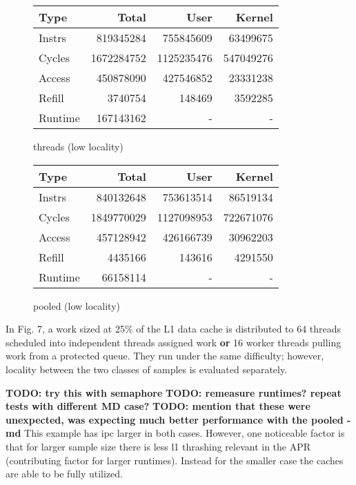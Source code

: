 \documentclass[11pt]{article}
\begin{document}
\begin{figure*}[!h]
	\begin{subtable}{.48\textwidth} 
		\centering
		\begin{tabular}{ l|rrr }
			Type    & Total      & User       & Kernel    \\
			\hline
			Instrs  & 819345284  & 755845609  & 63499675  \\
			Cycles  & 1672284752 & 1125235476 & 547049276 \\
			Access  & 450878090  & 427546852  & 23331238  \\
			Refill  & 3740754    & 148469     & 3592285   \\
			Runtime & 167143162  & -          & -         \\
			\hline
		\end{tabular}
		\caption{threads (low locality)}
	\end{subtable}
	\hfill
	\begin{subtable}{.48\textwidth} 
		\centering
		\begin{tabular}{ l|rrr }
			Type    & Total      & User       & Kernel    \\
			\hline
			Instrs  & 840132648  & 753613514  & 86519134  \\
			Cycles  & 1849770029 & 1127098953 & 722671076 \\
			Access  & 457128942  & 426166739  & 30962203  \\
			Refill  & 4435166    & 143616     & 4291550   \\
			Runtime & 66158114   & -          & -         \\
			\hline
		\end{tabular}
		\caption{pooled (low locality)}
	\end{subtable}
\end{figure*}

In Fig. 7, a work sized at 25\% of the L1 data cache is distributed to 64 threads scheduled into independent threads assigned work \textbf{or} 16 worker threads pulling work from a protected queue.  They run under the same difficulty; however, locality between the two classes of samples is evaluated separately.

\textbf{TODO: try this with semaphore}
\textbf{TODO: remeasure runtimes? repeat tests with different MD case?}
\textbf{TODO: mention that these were unexpected, was expecting much better performance with the pooled - md}
This example has ipc larger in both cases.    However, one noticeable factor is that for larger sample size there is less l1 thrashing relevant in the APR (contributing factor for larger runtimes).  Instead for the smaller case the caches are able to be fully utilized.
\end{document}
